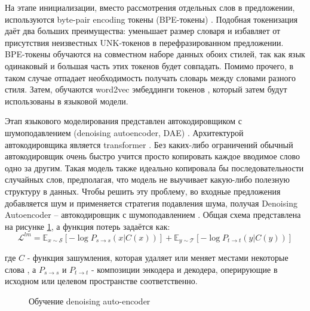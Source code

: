 
На этапе инициализации, вместо рассмотрения отдельных слов в предложении, используются byte-pair encoding токены (BPE-токены) \cite{bpe_tokens_article}.
Подобная токенизация даёт два больших преимущества: уменьшает размер словаря и избавляет от присутствия неизвестных UNK-токенов в перефразированном предложении.
BPE-токены обучаются на совместном наборе данных обоих стилей, так как язык одинаковый и большая часть этих токенов будет совпадать. Помимо прочего, в таком случае отпадает необходимость получать словарь между словами разного стиля.
Затем, обучаются word2vec эмбеддинги токенов \cite{mikolov2013distributed}, который затем будут использованы в языковой модели.

Этап языкового моделирования представлен автокодировщиком с шумоподавлением (denoising autoencoder, DAE) \cite{dae_article, lample2018phrasebased}.
Архитектурой автокодировщика является transformer \cite{attention_is_all_you_need}.
Без каких-либо ограничений обычный автокодировщик очень быстро учится просто копировать каждое вводимое слово одно за другим.
Такая модель также идеально копировала бы последовательности случайных слов, предполагая, что модель не выучивает какую-либо полезную структуру в данных.
Чтобы решить эту проблему, во входные предложения добавляется шум \cite{hill2016learning} и применяется стратегия подавления шума, получая Denoising Autoencoder -- автокодировщик с шумоподавлением \cite{dae_article}.
Общая схема представлена на рисунке \ref{fig:lample_dae}, а функция потерь задаётся как:
$$
\mathcal{L}^{lm} = 
\mathbb{E}_{x \sim \mathcal{S}} [-\log P_{s \rightarrow s}(x|C(x))] +
\mathbb{E}_{y \sim \mathcal{T}} [-\log P_{t \rightarrow t}(y|C(y))]
$$

где $C$ - функция зашумления, которая удаляет или меняет местами некоторые слова \cite{lample2018unsupervised}, а $P_{s \rightarrow s}$ и $P_{t \rightarrow t}$ - композиции энкодера и декодера, оперирующие в исходном или целевом пространстве соответственно.


\begin{figure}[ht]
  \centering
  \caption{Обучение denoising auto-encoder}
  \label{fig:lample_dae}
\end{figure}

